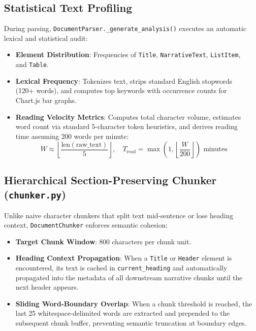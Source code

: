 \documentclass[11pt,a4paper]{article}
\begin{document}
\subsection{Statistical Text Profiling}
During parsing, \texttt{DocumentParser.\_generate\_analysis()} executes an automatic lexical and statistical audit:
\begin{itemize}[leftmargin=*]
    \item \textbf{Element Distribution}: Frequencies of \texttt{Title}, \texttt{NarrativeText}, \texttt{ListItem}, and \texttt{Table}.
    \item \textbf{Lexical Frequency}: Tokenizes text, strips standard English stopwords (120+ words), and computes top keywords with occurrence counts for Chart.js bar graphs.
    \item \textbf{Reading Velocity Metrics}: Computes total character volume, estimates word count via standard 5-character token heuristics, and derives reading time assuming 200 words per minute:
    \begin{equation}
    W \approx \left\lfloor \frac{\text{len}(\text{raw\_text})}{5} \right\rfloor, \quad T_{\text{read}} = \max\left(1, \left\lfloor \frac{W}{200} \right\rfloor\right) \text{ minutes}
    \end{equation}
\end{itemize}

\subsection{Hierarchical Section-Preserving Chunker (\texttt{chunker.py})}
Unlike naive character chunkers that split text mid-sentence or lose heading context, \texttt{DocumentChunker} enforces semantic cohesion:
\begin{itemize}[leftmargin=*]
    \item \textbf{Target Chunk Window}: 800 characters per chunk unit.
    \item \textbf{Heading Context Propagation}: When a \texttt{Title} or \texttt{Header} element is encountered, its text is cached in \texttt{current\_heading} and automatically propagated into the metadata of all downstream narrative chunks until the next header appears.
    \item \textbf{Sliding Word-Boundary Overlap}: When a chunk threshold is reached, the last 25 whitespace-delimited words are extracted and prepended to the subsequent chunk buffer, preventing semantic truncation at boundary edges.
\end{itemize}
\end{document}
